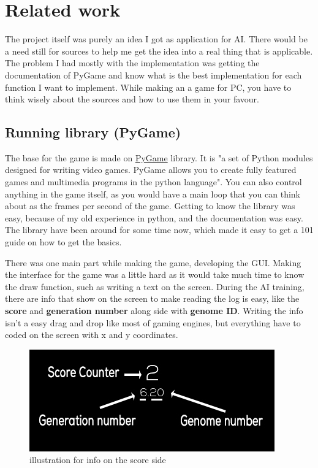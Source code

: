 \chapter{Related work}

The project itself was purely an idea I got as application for AI. There would be a need still for sources to help me get the idea into a real thing that is applicable. The problem I had mostly with the implementation was getting the documentation of PyGame and know what is the best implementation for each function I want to implement. While making an a game for PC, you have to think wisely about the sources and how to use them in your favour.

\section{ Running library (PyGame)}
The base for the game is made on \href{(https://www.pygame.org/wiki/about}{PyGame} library. It is "a set of Python modules designed for writing video games. PyGame allows you to create fully featured games and multimedia programs in the python language". You can also control anything in the game itself, as you would have a main loop that you can think about as the frames per second of the game. Getting to know the library was easy, because of my old experience in python, and the documentation was easy. The library have been around for some time now, which made it easy to get a 101 guide on how to get the basics.



There was one main part while making the game, developing the GUI. Making the interface for the game was a little hard as it would take much time to know the draw function, such as writing a text on the screen. During the AI training, there are info that show on the screen to make reading the log is easy, like the \textbf{score} and \textbf{generation number} along side with \textbf{genome ID}. Writing the info isn't a easy drag and drop like most of gaming engines, but everything have to coded on the screen with x and y coordinates.
\begin{figure}[H]
	\centering
	\includegraphics[width=0.7\linewidth]{usedImages/scoreFrame}
	\caption{illustration for info on the score side	}
	\label{fig:scoreframe}
\end{figure}

